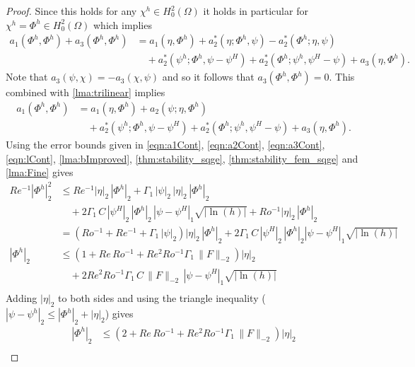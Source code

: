 \begin{proof}
  Since this holds for any $\chi^h\in H^2_0(\Omega)$ it holds in particular for $\chi^h=\Phi^h\in H^2_0(\Omega)$ which
  implies
  \begin{equation*}
    \begin{split}
      a_1(\Phi^h,\Phi^h) + a_3(\Phi^h,\Phi^h) &= a_1(\eta,\Phi^h) 
        + a_2^*(\eta;\Phi^h, \psi) - a_2^*(\Phi^h;\eta,\psi) \\ 
      &\quad+ a_2^*(\psi^h;\Phi^h,\psi-\psi^H) + a_2^*(\Phi^h; \psi^h,\psi^H-\psi)  
        + a_3(\eta,\Phi^h).
    \end{split}
  \end{equation*}
  Note that $a_3(\psi,\chi) = -a_3(\chi,\psi)$ and so it follows that $a_3(\Phi^h,\Phi^h) = 0$. This combined with
  \autoref{lma:trilinear} implies
  \begin{equation*}
    \begin{split}
      a_1(\Phi^h,\Phi^h) &= a_1(\eta,\Phi^h) + a_2(\psi;\eta,\Phi^h) \\ 
      &\quad+ a_2^*(\psi^h;\Phi^h,\psi-\psi^H) + a_2^*(\Phi^h; \psi^h,\psi^H-\psi)  
        + a_3(\eta,\Phi^h).
    \end{split}
  \end{equation*}
  Using the error bounds given in \eqref{eqn:a1Cont}, \eqref{eqn:a2Cont}, \eqref{eqn:a3Cont},
  \eqref{eqn:lCont}, \autoref{lma:bImproved}, \autoref{thm:stability_sqge},
  \autoref{thm:stability_fem_sqge} and \autoref{lma:Fine} gives 
  \begin{align*}
    Re^{-1} |\Phi^h|_2^2 &\le Re^{-1} |\eta|_2\, |\Phi^h|_2 + \Gamma_1\, |\psi|_2\, |\eta|_2\, |\Phi^h|_2 \\
      &\quad+ 2 \Gamma_1\, C\, |\psi^H|_2\, |\Phi^h|_2\, |\psi - \psi^H|_1 \sqrt{|\ln(h)|} + Ro^{-1}
        |\eta|_2\, |\Phi^h|_2 \\
    &= \left(Ro^{-1} + Re^{-1} + \Gamma_1\, |\psi|_2\right) |\eta|_2\, |\Phi^h|_2 + 2 \Gamma_1\, C\,
      |\psi^H|_2\, |\Phi^h|_2 |\psi - \psi^H|_1 \sqrt{|\ln(h)|}  \\
    |\Phi^h|_2 &\le \left(1 + Re\, Ro^{-1} + Re^2 Ro^{-1} \Gamma_1\, \|F\|_{-2}\right) |\eta|_2 \\
      &\quad + 2 Re^2 Ro^{-1} \Gamma_1\, C\, \|F\|_{-2}\, |\psi - \psi^H|_1 \sqrt{|\ln(h)|} \\
  \end{align*}
  Adding $|\eta|_2$ to both sides and using the triangle inequality ($|\psi - \psi^h|_2 \le |\Phi^h|_2 + |\eta|_2$) gives
  \begin{align*}
    |\Phi^h|_2 &\le \left(2 + Re\, Ro^{-1} + Re^2 Ro^{-1} \Gamma_1\, \|F\|_{-2}\right) |\eta|_2 \\

\end{align*}
\end{proof}
